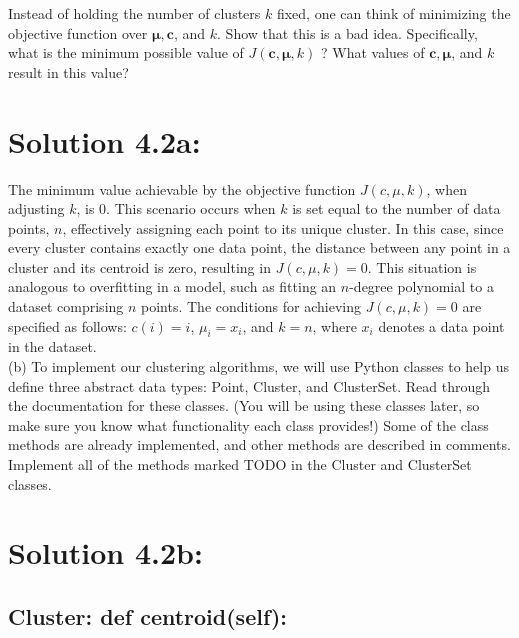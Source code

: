 \documentclass[10pt]{article}
\begin{document}
Instead of holding the number of clusters $k$ fixed, one can think of minimizing the objective function over $\boldsymbol{\mu}, \boldsymbol{c}$, and $k$. Show that this is a bad idea. Specifically, what is the minimum possible value of $J(\boldsymbol{c}, \boldsymbol{\mu}, k)$ ? What values of $\boldsymbol{c}, \boldsymbol{\mu}$, and $k$ result in this value?\\

\section*{Solution 4.2a:}

The minimum value achievable by the objective function $J(c, \mu, k)$, when adjusting $k$, is $0$. This scenario occurs when $k$ is set equal to the number of data points, $n$, effectively assigning each point to its unique cluster. In this case, since every cluster contains exactly one data point, the distance between any point in a cluster and its centroid is zero, resulting in $J(c, \mu, k) = 0$. This situation is analogous to overfitting in a model, such as fitting an $n$-degree polynomial to a dataset comprising $n$ points. The conditions for achieving $J(c, \mu, k) = 0$ are specified as follows: $c(i) = i$, $\mu_i = x_i$, and $k = n$, where $x_i$ denotes a data point in the dataset. \\

(b) To implement our clustering algorithms, we will use Python classes to help us define three abstract data types: Point, Cluster, and ClusterSet. Read through the documentation for these classes. (You will be using these classes later, so make sure you know what functionality each class provides!) Some of the class methods are already implemented, and other methods are described in comments. Implement all of the methods marked TODO in the Cluster and ClusterSet classes.

\section*{Solution 4.2b:}

\subsection*{Cluster: def centroid(self):}
\end{document}
